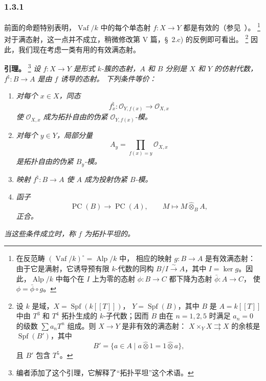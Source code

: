 \subsubsection*{1.3.1}
\label{sga3:VIIB:1.3.1}

前面的命题特别表明，\(\operatorname{Vaf}/k\) 中的每个单态射 \(f:X\to Y\)
都是有效的\textup{（参见\ ）}。
\footnote{在反范畴 \((\operatorname{Vaf}/k)^\circ=\operatorname{Alp}/k\) 中，
相应的映射 \(g:B\to A\) 是有效满态射：由于它是满射，它诱导预有限 \(k\)-代数的同构
\(B/I\xrightarrow{\sim}A\)，其中 \(I=\ker g\)。因此，\(\operatorname{Alp}/k\)
中每个在 \(I\) 上为零的态射 \(\phi:B\to C\) 都下降为态射 \(\bar\phi:A\to C\)，
使 \(\phi=\bar\phi\circ g\)。}
对于满态射，这一点并不成立，稍微修改第 V 篇，\S~2.c) 的反例即可看出。
\footnote{设 \(k\) 是域，\(X=\operatorname{Spf}(k[[T]])\)，
\(Y=\operatorname{Spf}(B)\)，其中 \(B\) 是 \(A=k[[T]]\) 中由 \(T^3\) 和
\(T^4\) 拓扑生成的 \(k\)-子代数；因而 \(B\) 由在 \(n=1,2,5\) 时满足
\(a_n=0\) 的级数 \(\sum a_nT^n\) 组成。则 \(X\to Y\) 是非有效的满态射：
\(X\times_YX\rightrightarrows X\) 的余核是 \(\operatorname{Spf}(B')\)，其中
\[
  B'=\{a\in A\mid
       a\widehat{\otimes}1=1\widehat{\otimes}a\},
\]
且 \(B'\) 包含 \(T^5\)。}
因此，我们现在考虑一类有用的有效满态射。

\medskip
\noindent\textbf{引理。}
\label{sga3:VIIB:1.3.1.flatness-criterion}
\footnote{编者添加了这个引理，它解释了“拓扑平坦”这个术语。}
{\itshape 设 \(f:X\to Y\) 是形式 \(k\)-簇的态射，\(A\) 和 \(B\) 分别是
\(X\) 和 \(Y\) 的仿射代数，\(f^\natural:B\to A\) 是由 \(f\) 诱导的态射。
下列条件等价：}
\begin{enumerate}
  \item[\textup{(i)}]
  {\itshape 对每个 \(x\in X\)，同态
  \[
    f_x^\natural:
    \mathcal O_{Y,f(x)}
    \longrightarrow
    \mathcal O_{X,x}
  \]
  使 \(\mathcal O_{X,x}\) 成为拓扑自由的伪紧
  \(\mathcal O_{Y,f(x)}\)-模。}

  \item[\textup{(ii)}]
  {\itshape 对每个 \(y\in Y\)，局部分量
  \[
    A_y=\prod_{f(x)=y}\mathcal O_{X,x}
  \]
  是拓扑自由的伪紧 \(B_y\)-模。}

  \item[\textup{(iii)}]
  {\itshape 映射 \(f^\natural:B\to A\) 使 \(A\) 成为投射伪紧 \(B\)-模。}

  \item[\textup{(iv)}]
  {\itshape 函子
  \[
    \operatorname{PC}(B)\longrightarrow\operatorname{PC}(A),
    \qquad
    M\longmapsto M\widehat{\otimes}_B A,
  \]
  正合。}
\end{enumerate}
{\itshape 当这些条件成立时，称 \(f\) 为\emph{拓扑平坦}的。}

